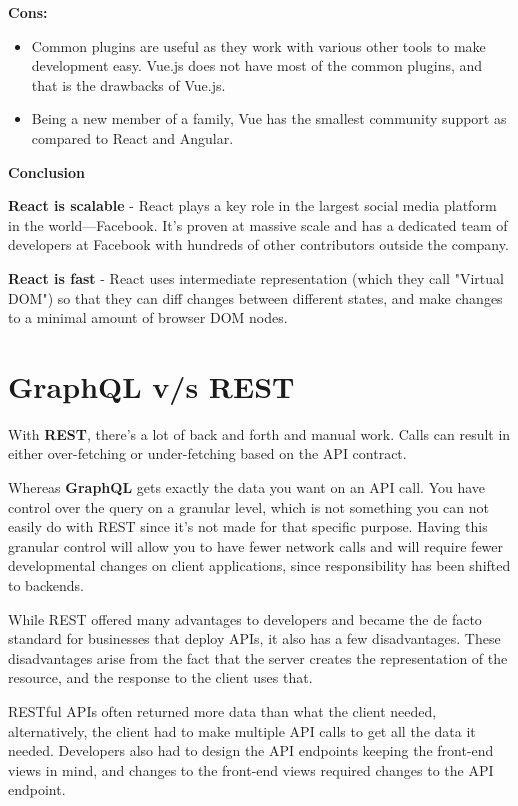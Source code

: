 \begin{enumerate}[label=\Alph*.]
\textbf{Cons:}

\begin{itemize}
  \item Common plugins are useful as they work with various other tools to make development easy. Vue.js does not have most of the common plugins, and that is the drawbacks of Vue.js.
  \item Being a new member of a family, Vue has the smallest community support as compared to React and Angular. 
\end{itemize}

\textbf{Conclusion}

\textbf{React is scalable} - React plays a key role in the largest social media platform in the world—Facebook. It’s proven at massive scale and has a dedicated team of developers at Facebook with hundreds of other contributors outside the company.

\textbf{React is fast} - React uses intermediate representation (which they call "Virtual DOM") so that they can diff changes between different states, and make changes to a minimal amount of browser DOM nodes.

\section{GraphQL v/s  REST}

With \textbf{REST}, there’s a lot of back and forth and manual work. Calls can result in either over-fetching or under-fetching based on the API contract. 

Whereas \textbf{GraphQL} gets exactly the data you want on an API call. You have control over the query on a granular level, which is not something you can not easily do with REST since it’s not made for that specific purpose. Having this granular control will allow you to have fewer network calls and will require fewer developmental changes on client applications, since responsibility has been shifted to backends.

While REST offered many advantages to developers and became the de facto standard for businesses that deploy APIs, it also has a few disadvantages. These disadvantages arise from the fact that the server creates the representation of the resource, and the response to the client uses that. 

RESTful APIs often returned more data than what the client needed, alternatively, the client had to make multiple API calls to get all the data it needed. Developers also had to design the API endpoints keeping the front-end views in mind, and changes to the front-end views required changes to the API endpoint. 


\end{enumerate}
